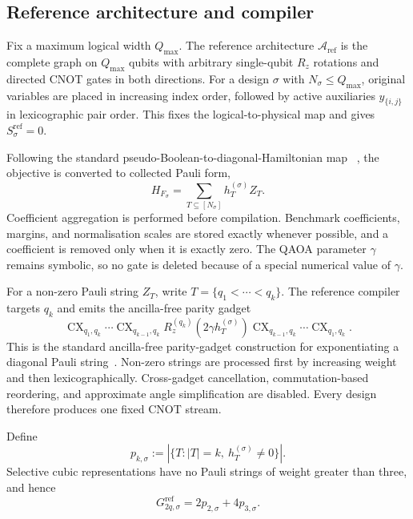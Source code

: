 \documentclass[a4paper,onecolumn,11pt,unpublished]{quantumarticle}
\theoremstyle{remark}
\begin{document}
\subsection{Reference architecture and compiler}
\label{app:reference-compiler}

Fix a maximum logical width \(Q_{\max}\).  The reference architecture
\(\mathcal A_{\mathrm{ref}}\) is the complete graph on \(Q_{\max}\) qubits
with arbitrary single-qubit \(R_z\) rotations and directed CNOT gates in
both directions.  For a design \(\sigma\) with
\(N_\sigma\leq Q_{\max}\), original variables are placed in increasing
index order, followed by active auxiliaries \(y_{\{i,j\}}\) in
lexicographic pair order.  This fixes the logical-to-physical map and gives
\(S_\sigma^{\mathrm{ref}}=0\).

Following the standard pseudo-Boolean-to-diagonal-Hamiltonian map
~\cite{Hadfield2021}, the objective is converted to collected Pauli form,
\begin{equation}
    H_{F_\sigma}
    =
    \sum_{T\subseteq[N_\sigma]}h_T^{(\sigma)}Z_T.
    \label{eq:reference-collected-hamiltonian}
\end{equation}
Coefficient aggregation is performed before compilation.  Benchmark
coefficients, margins, and normalisation scales are stored exactly whenever
possible, and a coefficient is removed only when it is exactly zero.  The
QAOA parameter \(\gamma\) remains symbolic, so no gate is deleted because
of a special numerical value of \(\gamma\).

For a non-zero Pauli string \(Z_T\), write
\(T=\{q_1<\cdots<q_k\}\).  The reference compiler targets \(q_k\) and emits
the ancilla-free parity gadget
\begin{equation}
    \operatorname{CX}_{q_1,q_k}\cdots
    \operatorname{CX}_{q_{k-1},q_k}
    R_z^{(q_k)}\!\left(2\gamma h_T^{(\sigma)}\right)
    \operatorname{CX}_{q_{k-1},q_k}\cdots
    \operatorname{CX}_{q_1,q_k}.
    \label{eq:reference-parity-gadget}
\end{equation}
This is the standard ancilla-free parity-gadget construction for exponentiating
a diagonal Pauli string~\cite{CampbellDahl2022,Verchere2023}.
Non-zero strings are processed first by increasing weight and then
lexicographically.  Cross-gadget cancellation, commutation-based
reordering, and approximate angle simplification are disabled.  Every
design therefore produces one fixed CNOT stream.

Define
\begin{equation}
    p_{k,\sigma}
    :=
    \left|
        \{T:|T|=k,\ h_T^{(\sigma)}\neq0\}
    \right|.
    \label{eq:reference-pauli-count}
\end{equation}
Selective cubic representations have no Pauli strings of weight greater
than three, and hence
\begin{equation}
    G_{2q,\sigma}^{\mathrm{ref}}
    =2p_{2,\sigma}+4p_{3,\sigma}.
    \label{eq:reference-gate-count}
\end{equation}
\end{document}
